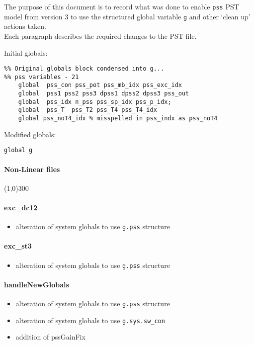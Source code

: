 \documentclass[12pt]{article}
\begin{document}
The purpose of this document is to record what was done to enable \verb|pss| PST model from version 3 to use the structured global variable \verb|g| and other `clean up' actions taken. \\
Each paragraph describes the required changes to the PST file.

Initial globals:
\begin{verbatim}
%% Original globals block condensed into g...
%% pss variables - 21
    global  pss_con pss_pot pss_mb_idx pss_exc_idx
    global  pss1 pss2 pss3 dpss1 dpss2 dpss3 pss_out
    global  pss_idx n_pss pss_sp_idx pss_p_idx;
    global  pss_T  pss_T2 pss_T4 pss_T4_idx  
    global pss_noT4_idx % misspelled in pss_indx as pss_noT4
\end{verbatim}

Modified globals:
\begin{verbatim}
global g
\end{verbatim}

\paragraph{Non-Linear files}\line(1,0){300}
\paragraph{exc\_dc12}
	\begin{itemize}
		\item alteration of system globals to use \verb|g.pss| structure
	\end{itemize}
	
\paragraph{exc\_st3}
	\begin{itemize}
		\item alteration of system globals to use \verb|g.pss| structure
	\end{itemize}
	
\paragraph{handleNewGlobals}
	\begin{itemize}
		\item alteration of system globals to use \verb|g.pss| structure
		\item alteration of system globals to use \verb|g.sys.sw_con|
		\item addition of pssGainFix
	\end{itemize}
	
\end{document}
